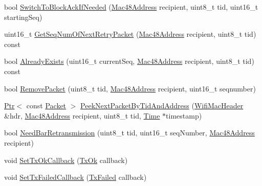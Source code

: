 \begin{DoxyCompactItemize}
\item 
bool \hyperlink{classns3_1_1BlockAckManager_a20324b49d01312f731087f7f707a596a}{Switch\+To\+Block\+Ack\+If\+Needed} (\hyperlink{classns3_1_1Mac48Address}{Mac48\+Address} recipient, uint8\+\_\+t tid, uint16\+\_\+t starting\+Seq)
\item 
uint16\+\_\+t \hyperlink{classns3_1_1BlockAckManager_a32100b41ee7ee435aabb90a2e4cdd12d}{Get\+Seq\+Num\+Of\+Next\+Retry\+Packet} (\hyperlink{classns3_1_1Mac48Address}{Mac48\+Address} recipient, uint8\+\_\+t tid) const 
\item 
bool \hyperlink{classns3_1_1BlockAckManager_a36a1c566d4039034d22b9afead55c199}{Already\+Exists} (uint16\+\_\+t current\+Seq, \hyperlink{classns3_1_1Mac48Address}{Mac48\+Address} recipient, uint8\+\_\+t tid) const 
\item 
bool \hyperlink{classns3_1_1BlockAckManager_a182b0fff297640c289affb334a61f544}{Remove\+Packet} (uint8\+\_\+t tid, \hyperlink{classns3_1_1Mac48Address}{Mac48\+Address} recipient, uint16\+\_\+t seqnumber)
\item 
\hyperlink{classns3_1_1Ptr}{Ptr}$<$ const \hyperlink{classns3_1_1Packet}{Packet} $>$ \hyperlink{classns3_1_1BlockAckManager_a7a235987d23102bd1e0bf0b73cb671b5}{Peek\+Next\+Packet\+By\+Tid\+And\+Address} (\hyperlink{classns3_1_1WifiMacHeader}{Wifi\+Mac\+Header} \&hdr, \hyperlink{classns3_1_1Mac48Address}{Mac48\+Address} recipient, uint8\+\_\+t tid, \hyperlink{classns3_1_1Time}{Time} $\ast$timestamp)
\item 
bool \hyperlink{classns3_1_1BlockAckManager_a8be3e6dc77c96e4cbc317302ad79a5ac}{Need\+Bar\+Retransmission} (uint8\+\_\+t tid, uint16\+\_\+t seq\+Number, \hyperlink{classns3_1_1Mac48Address}{Mac48\+Address} recipient)
\item 
void \hyperlink{classns3_1_1BlockAckManager_a2007df06d972c94c7e2b35b7b0bce555}{Set\+Tx\+Ok\+Callback} (\hyperlink{classns3_1_1BlockAckManager_a982d21c899e65a7d1bdc181c8d6de2b4}{Tx\+Ok} callback)
\item 
void \hyperlink{classns3_1_1BlockAckManager_a0ee71617a29e7e00ab9c62194b4501a7}{Set\+Tx\+Failed\+Callback} (\hyperlink{classns3_1_1BlockAckManager_a19b8dc1978e36f011ad60a91c1c7d09c}{Tx\+Failed} callback)
\end{DoxyCompactItemize}
